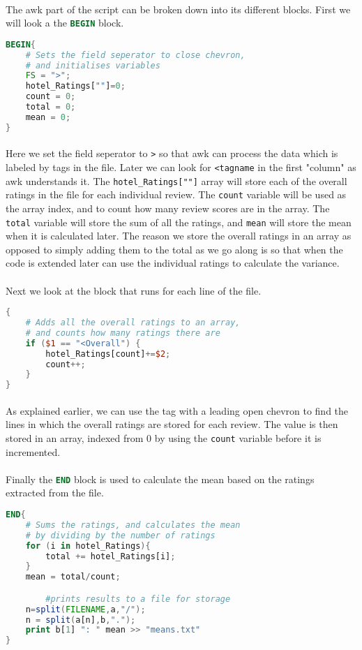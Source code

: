 \documentclass[10pt]{article}
\begin{document}
\paragraph{}
The awk part of the script can be broken down into its different blocks. First we will look a the \lstinline[language=awk]$BEGIN$ block.
\begin{lstlisting}[language = awk]
BEGIN{
	# Sets the field seperator to close chevron, 
	# and initialises variables
	FS = ">"; 
	hotel_Ratings[""]=0;
	count = 0;
	total = 0;
	mean = 0;
}
\end{lstlisting}
\paragraph{}
Here we set the field seperator to \lstinline$>$ so that  awk can process the data which is labeled by tags in the file. Later we can look for \lstinline$<tagname$ in the first "column" as awk understands it. The \lstinline$hotel_Ratings[""]$ array will store each of the overall ratings in the file for each individual review. The \lstinline$count$ variable will be used as the array index, and to count how many review scores are in the array. The \lstinline$total$ variable will store the sum of all the ratings, and \lstinline$mean$ will store the mean when it is calculated later. The reason we store the overall ratings in an array as opposed to simply adding them to the total as we go along is so that when the code is extended later can use the individual ratings to calculate the variance.
\pagebreak
\paragraph{}
Next we look at the block that runs for each line of the file.
\begin{lstlisting}[language = awk]
{
	# Adds all the overall ratings to an array,
	# and counts how many ratings there are
	if ($1 == "<Overall") {
		hotel_Ratings[count]+=$2;
		count++;
	}
}
\end{lstlisting}
\paragraph{}
As explained earlier, we can use the tag with a leading open chevron to find the lines in which the overall ratings are stored for each review. The value is then stored in an array, indexed from 0 by using the \lstinline$count$ variable before it is incremented.
\paragraph{}
Finally the \lstinline[language=awk]$END$ block is used to calculate the mean based on the ratings extracted from the file.
\begin{lstlisting}[language=awk]
END{
	# Sums the ratings, and calculates the mean 
	# by dividing by the number of ratings
	for (i in hotel_Ratings){
		total += hotel_Ratings[i];
	}
	mean = total/count;

		#prints results to a file for storage
	n=split(FILENAME,a,"/");
	n = split(a[n],b,".");
	print b[1] ": " mean >> "means.txt"
}
\end{lstlisting}
\end{document}

